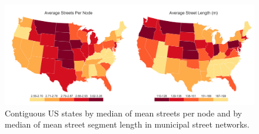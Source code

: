 \documentclass[11pt]{article}
\begin{document}
\begin{multicols}{2}
\begin{figure}[htbp]
	\centering
	\includegraphics[width=1\textwidth]{fig04.png}
	\caption{Contiguous US states by median of mean streets per node and by median of mean street segment length in municipal street networks.}
	\label{fig:fig04}
\end{figure}


\end{multicols}
\end{document}
